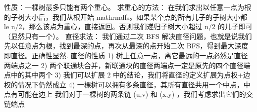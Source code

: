 {}性质：一棵树最多只能有两个重心。\markdownRendererParagraphSeparator
{}求重心的方法：\markdownRendererParagraphSeparator
{}在我们求出以任意一点为根的子树大小后，我们从根开始 \markdownRendererDollarSign{}\markdownRendererBackslash{}mathrm\markdownRendererLeftBrace{}dfs\markdownRendererRightBrace{}\markdownRendererDollarSign{}。如果某个点的所有儿子的子树大小都 \markdownRendererDollarSign{}\markdownRendererBackslash{}le n/2\markdownRendererDollarSign{}，那么该点为重心，直接返回。否则我们递归子树大小超过 \markdownRendererDollarSign{}n/2\markdownRendererDollarSign{} 的儿子即可（显然只有一个）。\markdownRendererInterblockSeparator
{}\markdownRendererInterblockSeparator
{}
\markdownRendererSectionEnd \markdownRendererSectionBegin
{}\markdownRendererInterblockSeparator
{}直径求法：\markdownRendererParagraphSeparator
{}我们通过二次 \markdownRendererDollarSign{}BFS\markdownRendererDollarSign{} 解决直径问题，也就是说我们先以任意点为根，找到最深的点，再次从最深的点开始二次 \markdownRendererDollarSign{}BFS\markdownRendererDollarSign{}，得到最大深度即直径。正确性显然.\markdownRendererInterblockSeparator
{}\markdownRendererInterblockSeparator
{}直径的性质\markdownRendererParagraphSeparator
{}\markdownRendererDollarSign{} 1) \markdownRendererDollarSign{}树上任意一点，离它最远的一点必然是直径两端点之一\markdownRendererParagraphSeparator
{}\markdownRendererDollarSign{} 2) \markdownRendererDollarSign{}两个联通块合并，新联通块的直径两端点一定是原先的四个直径端点中的其中两个\markdownRendererParagraphSeparator
{}\markdownRendererDollarSign{} 3) \markdownRendererDollarSign{}我们可以扩展\markdownRendererDollarSign{} 2 \markdownRendererDollarSign{}中的结论，我们将直径的定义扩展为点权+边权的情况下仍然成立\markdownRendererParagraphSeparator
{}\markdownRendererDollarSign{} 4) \markdownRendererDollarSign{}一棵树可以拥有多条直径，其所有直径共用一个中点，中点有可能在边上\markdownRendererInterblockSeparator
{}
\markdownRendererSectionEnd \markdownRendererSectionBegin
{}\markdownRendererInterblockSeparator
{}我们对于一棵树的两条链\markdownRendererDollarSign{} (u,v) \markdownRendererDollarSign{}和\markdownRendererDollarSign{} (x,y) \markdownRendererDollarSign{}，我们考虑求出它们的交链端点\markdownRendererParagraphSeparator
